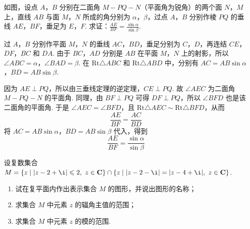 \begin{problem}
如图，设点 \(A\)，\(B\) 分别在二面角 \(M-PQ-N\)（平面角为锐角）的两个面 \(N\)，\(M\) 上，直线 \(AB\) 与面 \(M\)，\(N\) 所成的角分别为 \(\alpha\)，\(\beta\)，过点 \(A\)，\(B\) 分别作棱 \(PQ\) 的垂线 \(AE\)，\(BF\)，垂足为 \(E\)，\(F\). 求证：\(\frac{AE}{BF}=\frac{\sin \alpha}{\sin \beta}\).

\end{problem}

\begin{solution}
过 \(A\)，\(B\) 分别作平面 \(M\)，\(N\) 的垂线 \(AC\)，\(BD\)，垂足分别为 \(C\)，\(D\)，再连结 \(CE\)，\(DF\)，\(BC\) 和 \(DA\). 由于 \(BC\)，\(AD\) 分别是 \(AB\) 在平面 \(M\)，\(N\) 上的射影，所以 \(\angle ABC=\alpha\)，\(\angle BAD=\beta\). 在 \(\mathrm{Rt}\triangle ABC\) 和 \(\mathrm{Rt}\triangle ABD\) 中，分别有 \(AC=AB\sin\alpha\)，\(BD=AB\sin\beta\).


因为 \(AE\perp PQ\)，所以由三垂线定理的逆定理，\(CE\perp PQ\). 故 \(\angle AEC\) 为二面角 \(M-PQ-N\) 的平面角. 同理，由 \(BF\perp PQ\) 可得 \(DF\perp PQ\)，所以 \(\angle BFD\) 也是该二面角的平面角. 于是 \(\angle AEC=\angle BFD\)，且 \(\mathrm{Rt}\triangle AEC\sim \mathrm{Rt}\triangle BFD\)，从而
\[
\frac{AE}{BF}=\frac{AC}{BD}
\]
将 \(AC=AB\sin\alpha\)，\(BD=AB\sin\beta\) 代入，得到
\[
\frac{AE}{BF}=\frac{\sin\alpha}{\sin\beta}
\]
\end{solution}

\begin{problem}
设复数集合 \(M=\left\{z\mid |z-2+\i|\leqslant 2,\ z\in \mathbf{C}\right\}\cap \left\{z\mid |z-2-\i|=|z-4+\i|,\ z\in \mathbf{C}\right\}\).
\begin{enumerate}
\item 试在复平面内作出表示集合 \(M\) 的图形，并说出图形的名称；
\item 求集合 \(M\) 中元素 \(z\) 的辐角主值的范围；
\item 求集合 \(M\) 中元素 \(z\) 的模的范围.
\end{enumerate}
\end{problem}

